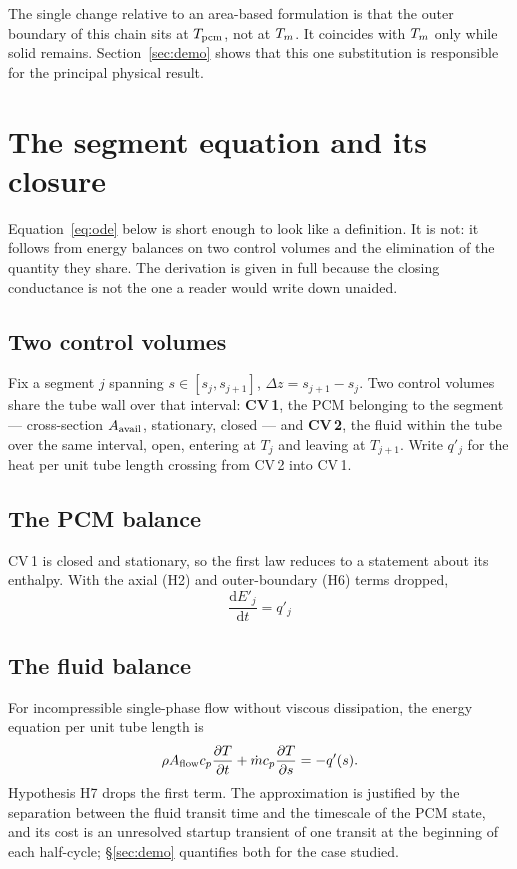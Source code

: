The single change relative to an area-based formulation is that the outer
boundary of this chain sits at $T_{\mathrm{pcm}}$, not at $T_{m}$. It coincides with $T_{m}$
only while solid remains. Section~\ref{sec:demo} shows that this one
substitution is responsible for the principal physical result.

\section{The segment equation and its closure}
\label{sec:closure}

Equation~\eqref{eq:ode} below is short enough to look like a definition. It is
not: it follows from energy balances on two control volumes and the elimination
of the quantity they share. The derivation is given in full because the closing
conductance is not the one a reader would write down unaided.

\subsection{Two control volumes}

Fix a segment $j$ spanning $s\in[s_{j},s_{j+1}]$, $\Delta z=s_{j+1}-s_{j}$. Two
control volumes share the tube wall over that interval: \textbf{CV\,1}, the PCM
belonging to the segment --- cross-section $A_{\mathrm{avail}}$, stationary, closed --- and
\textbf{CV\,2}, the fluid within the tube over the same interval, open, entering
at $T_{j}$ and leaving at $T_{j+1}$. Write $q'_{j}$ for the heat per unit tube
length crossing from CV\,2 into CV\,1.

\subsection{The PCM balance}

CV\,1 is closed and stationary, so the first law reduces to a statement about
its enthalpy. With the axial (H2) and outer-boundary (H6) terms dropped,
\begin{equation}
  \boxed{\;\frac{\mathrm{d}E'_{j}}{\mathrm{d}t} = q'_{j}\;}
  \label{eq:pcm-balance}
\end{equation}

\subsection{The fluid balance}

For incompressible single-phase flow without viscous dissipation, the energy
equation per unit tube length is
\begin{equation}
  \rho A_{\mathrm{flow}} c_{p}\frac{\partial T}{\partial t}
  + \dot m c_{p}\frac{\partial T}{\partial s} = -q'(s).
  \label{eq:fluid-pde}
\end{equation}
Hypothesis H7 drops the first term. The approximation is justified by the
separation between the fluid transit time and the timescale of the PCM state,
and its cost is an unresolved startup transient of one transit at the beginning
of each half-cycle; \S\ref{sec:demo} quantifies both for the case studied.

